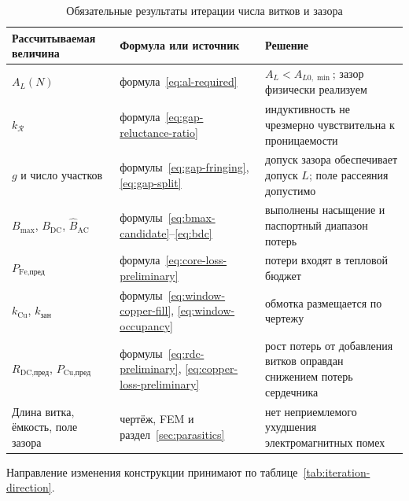 \documentclass[14pt,a4paper]{extarticle}
\begin{document}
\begin{table}[H]
\caption{Обязательные результаты итерации числа витков и зазора}
\label{tab:turn-gap-iteration}
\centering
\scriptsize
\begin{tabularx}{\textwidth}{>{\raggedright\arraybackslash}p{35mm}
>{\raggedright\arraybackslash}p{53mm} X}
\toprule
Рассчитываемая величина & Формула или источник & Решение \\
\midrule
$A_L(N)$ & формула~\eqref{eq:al-required} &
$A_L<A_{L0,\min}$; зазор физически реализуем \\
$k_{\mathcal R}$ & формула~\eqref{eq:gap-reluctance-ratio} &
индуктивность не чрезмерно чувствительна к проницаемости \\
$g$ и число участков & формулы~\eqref{eq:gap-fringing},
\eqref{eq:gap-split} &
допуск зазора обеспечивает допуск $L$; поле рассеяния допустимо \\
$B_{\max}$, $B_{\text{DC}}$, $\widehat B_{\text{AC}}$ &
формулы~\eqref{eq:bmax-candidate}--\eqref{eq:bdc} &
выполнены насыщение и паспортный диапазон потерь \\
$P_{\text{Fe,пред}}$ & формула~\eqref{eq:core-loss-preliminary} &
потери входят в тепловой бюджет \\
$k_{\text{Cu}}$, $k_{\text{зан}}$ &
формулы~\eqref{eq:window-copper-fill},
\eqref{eq:window-occupancy} &
обмотка размещается по чертежу \\
$R_{\text{DC,пред}}$, $P_{\text{Cu,пред}}$ &
формулы~\eqref{eq:rdc-preliminary},
\eqref{eq:copper-loss-preliminary} &
рост потерь от добавления витков оправдан снижением потерь сердечника \\
Длина витка, ёмкость, поле зазора &
чертёж, FEM и раздел~\ref{sec:parasitics} &
нет неприемлемого ухудшения электромагнитных помех \\
\bottomrule
\end{tabularx}
\end{table}

Направление изменения конструкции принимают по
таблице~\ref{tab:iteration-direction}.
\end{document}
